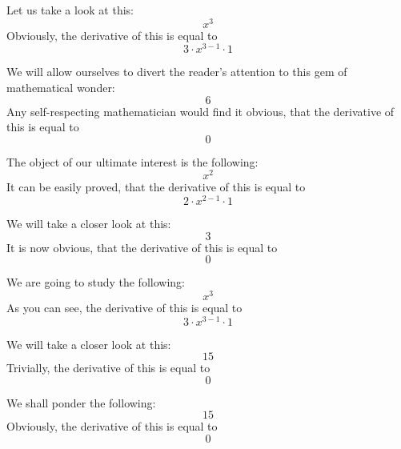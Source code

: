 \documentclass{article}
\begin{document}
Let us take a look at this:
\begin{equation}
x ^{3 } 
\end{equation}
Obviously, the derivative of this is equal to
\begin{equation}
3 \cdot x ^{3 - 1 } \cdot 1 
\end{equation}

We will allow ourselves to divert the reader's attention to this gem of mathematical wonder:
\begin{equation}
6 
\end{equation}
Any self-respecting mathematician would find it obvious, that the derivative of this is equal to
\begin{equation}
0 
\end{equation}

The object of our ultimate interest is the following:
\begin{equation}
x ^{2 } 
\end{equation}
It can be easily proved, that the derivative of this is equal to
\begin{equation}
2 \cdot x ^{2 - 1 } \cdot 1 
\end{equation}

We will take a closer look at this:
\begin{equation}
3 
\end{equation}
It is now obvious, that the derivative of this is equal to
\begin{equation}
0 
\end{equation}

We are going to study the following:
\begin{equation}
x ^{3 } 
\end{equation}
As you can see, the derivative of this is equal to
\begin{equation}
3 \cdot x ^{3 - 1 } \cdot 1 
\end{equation}

We will take a closer look at this:
\begin{equation}
15 
\end{equation}
Trivially, the derivative of this is equal to
\begin{equation}
0 
\end{equation}

We shall ponder the following:
\begin{equation}
15 
\end{equation}
Obviously, the derivative of this is equal to
\begin{equation}
0 
\end{equation}
\end{document}
